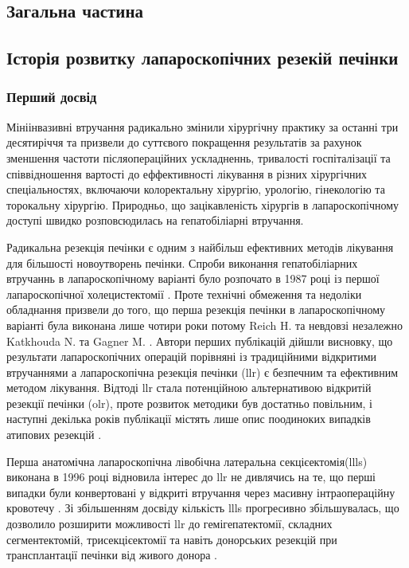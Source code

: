 \begin{refsection}
\chapter{Загальна частина}
\section{Історія розвитку лапароскопічних резекій печінки}
\subsection{Перший досвід}
Мініінвазивні втручання радикально змінили хірургічну практику за останні три десятиріччя та призвели до суттєвого покращення результатів за рахунок зменшення частоти післяопераційних ускладненнь, тривалості госпіталізації та співвідношення вартості до еффективності лікування в різних хірургічних спеціальностях, включаючи колоректальну хірургію, урологію, гінекологію та торокальну хірургію. Природньо, що зацікавленість хірургів в лапароскопічному доступі швидко розповсюдилась на гепатобіліарні втручання.

Радикальна резекція печінки є одним з найбільш ефективних методів лікування для більшості новоутворень печінки. Спроби виконання гепатобіліарних втручаннь в лапароскопічному варіанті було розпочато в 1987 році із першої лапароскопічної холецистектомії \cite{Litynski}. Проте технічні обмеження та недоліки обладнання призвели до того, що перша резекція печінки в лапароскопічному варіанті була виконана лише чотири роки потому Reich H. \cite{Reich1991a} та невдовзі незалежно Katkhouda N. \cite{Katkhouda1992} та Gagner M. \cite{GAGNER1992}. Автори перших публікацій дійшли висновку, що результати лапароскопічних операцій порівняні із традиційними відкритими втручаннями а лапароскопічна резекція печінки (\acrshort{llr}) є безпечним та ефективним методом лікування. Відтоді \acrshort{llr} стала потенційною альтернативою відкритій резекції печінки (\acrshort{olr}), проте розвиток методики був достатньо повільним, і наступні декілька років публікації містять лише опис поодиноких випадків атипових резекцій \cite{Cunningham1995, Klotz1993}. 

Перша анатомічна лапароскопічна лівобічна латеральна секцієектомія(\acrshort{llls}) виконана в 1996 році відновила інтерес до \acrshort{llr} не дивлячись на те, що перші випадки були конвертовані у відкриті втручання через масивну інтраопераційну кровотечу \cite{Hashizume1995, Azagra1996}.  Зі збільшенням досвіду кількість \acrshort{llls} прогресивно збільшувалась, що  дозволило розширити можливості \acrshort{llr} до гемігепатектомії, складних сегментектомій, трисекцієектомії та навіть донорських резекцій при трансплантації печінки від живого донора \cite{Dagher2009, Cherqui2002, Jia2018}.

\end{refsection}
